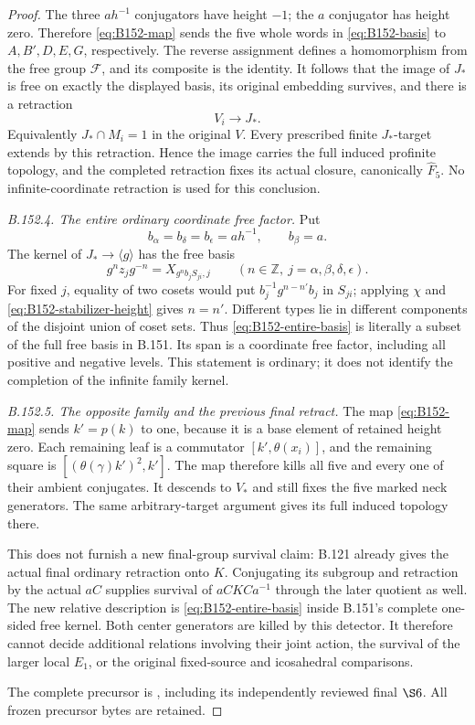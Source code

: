 \begin{proof}
The three \(ah^{-1}\) conjugators have height \(-1\);
the \(a\) conjugator has height zero. Therefore
\eqref{eq:B152-map} sends the five whole words in
\eqref{eq:B152-basis} to \(A,B',D,E,G\), respectively.
The reverse assignment defines a homomorphism from the
free group \(\mathcal F\), and its composite is the identity.
It follows that the image of \(J_*\) is free on exactly the
displayed basis, its original embedding survives, and there
is a retraction
\[
 V_i\longrightarrow J_*.
\]
Equivalently \(J_*\cap M_i=1\) in the original \(V\).
Every prescribed finite \(J_*\)-target extends by this
retraction. Hence the image carries the full induced
profinite topology, and the completed retraction fixes its
actual closure, canonically \(\widehat F_5\).
No infinite-coordinate retraction is used for this conclusion.

\emph{B.152.4. The entire ordinary coordinate free factor.}
Put
\[
 b_\alpha=b_\delta=b_\epsilon=ah^{-1},
 \qquad b_\beta=a.
\]
The kernel of \(J_*\to\langle g\rangle\) has the free basis
\begin{equation}\label{eq:B152-entire-basis}
 g^n z_jg^{-n}
      =X_{g^n b_j S_{ji},j}
 \qquad(n\in\mathbb Z,\ j=\alpha,\beta,\delta,\epsilon).
\end{equation}
For fixed \(j\), equality of two cosets would put
\(b_j^{-1}g^{n-n'}b_j\) in \(S_{ji}\); applying \(\chi\)
and \eqref{eq:B152-stabilizer-height} gives \(n=n'\).
Different types lie in different components of the disjoint
union of coset sets. Thus \eqref{eq:B152-entire-basis} is
literally a subset of the full free basis in B.151. Its span
is a coordinate free factor, including all positive and
negative levels. This statement is ordinary; it does not
identify the completion of the infinite family kernel.

\emph{B.152.5. The opposite family and the previous final retract.}
The map \eqref{eq:B152-map} sends \(k'=p(k)\) to one,
because it is a base element of retained height zero.
Each remaining leaf is a commutator
\([k',\theta(x_i)]\), and the remaining square is
\([(\theta(\gamma)k')^2,k']\). The map therefore kills
all five and every one of their ambient conjugates.
It descends to \(V_*\) and still fixes the five marked
neck generators. The same arbitrary-target argument gives
its full induced topology there.

This does not furnish a new final-group survival claim:
B.121 already gives the actual final ordinary retraction
onto \(K\). Conjugating its subgroup and retraction by
the actual \(aC\) supplies survival of \(aCKCa^{-1}\)
through the later quotient as well. The new relative
description is \eqref{eq:B152-entire-basis} inside B.151's
complete one-sided free kernel. Both center generators
are killed by this detector. It therefore cannot decide
additional relations involving their joint action, the
survival of the larger local \(E_1\), or the original
fixed-source and icosahedral comparisons.

\smallskip\noindent
The complete precursor is
,
including its independently reviewed final \(\S6\).
All frozen precursor bytes are retained.
\end{proof}
